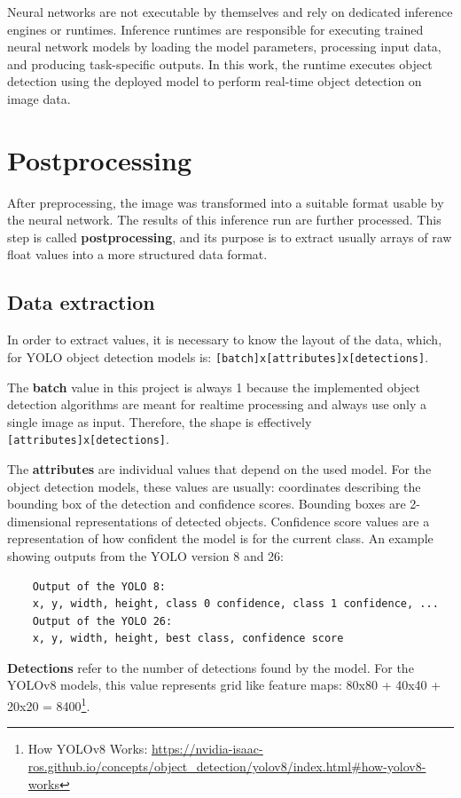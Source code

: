 Neural networks are not executable by themselves and rely on dedicated inference engines or runtimes. Inference runtimes are responsible for executing trained neural network models by loading the model parameters, processing input data, and producing task-specific outputs. In this work, the runtime executes object detection using the deployed model to perform real-time object detection on image data.

\section{Postprocessing}
\label{postprocessing}
After preprocessing, the image was transformed into a suitable format usable by the neural network. The results of this inference run are further processed. This step is called \textbf{postprocessing}, and its purpose is to extract usually arrays of raw float values into a more structured data format.

\subsection{Data extraction}
\label{dataExtraction}
In order to extract values, it is necessary to know the layout of the data, which, for YOLO object detection models is: \texttt{[batch]x[attributes]x[detections]}. 

The \textbf{batch} value in this project is always 1 because the implemented object detection algorithms are meant for realtime processing and always use only a single image as input. Therefore, the shape is effectively \texttt{[attributes]x[detections]}. 

The \textbf{attributes} are individual values that depend on the used model. For the object detection models, these values are usually: coordinates describing the bounding box of the detection and confidence scores. Bounding boxes are 2-dimensional representations of detected objects. Confidence score values are a representation of how confident the model is for the current class. An example showing outputs from the YOLO version 8 and 26:
\begin{verbatim}
    Output of the YOLO 8:
    x, y, width, height, class 0 confidence, class 1 confidence, ...
    Output of the YOLO 26:
    x, y, width, height, best class, confidence score
\end{verbatim}

\textbf{Detections} refer to the number of detections found by the model. For the YOLOv8 models, this value represents grid like feature maps: 80x80 + 40x40 + 20x20 = 8400\footnote{How YOLOv8 Works: \url{https://nvidia-isaac-ros.github.io/concepts/object_detection/yolov8/index.html\#how-yolov8-works}}.

